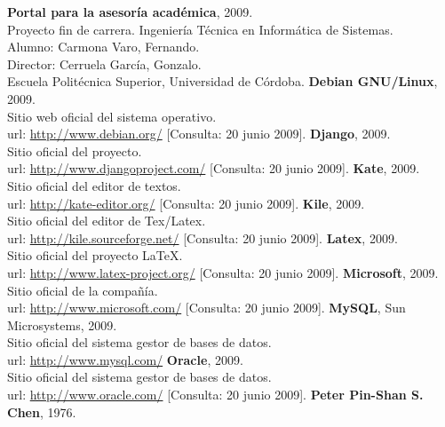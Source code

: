 \begin{thebibliography}{xx}

 \textbf{Portal para la asesoría académica}, 2009.\\
         Proyecto fin de carrera. Ingeniería Técnica en Informática de Sistemas.\\
         Alumno: Carmona Varo, Fernando.\\
         Director: Cerruela García, Gonzalo.\\
         Escuela Politécnica Superior, Universidad de Córdoba.
 \textbf{Debian GNU/Linux}, 2009.\\
         Sitio web oficial del sistema operativo.\\
         url: \url{http://www.debian.org/}
         [Consulta: 20 junio 2009].
 \textbf{Django}, 2009.\\
         Sitio oficial del proyecto.\\
         url: \url{http://www.djangoproject.com/}
         [Consulta: 20 junio 2009].
 \textbf{Kate}, 2009.\\
         Sitio oficial del editor de textos.\\
         url: \url{http://kate-editor.org/}
         [Consulta: 20 junio 2009].
 \textbf{Kile}, 2009.\\
         Sitio oficial del editor de Tex/Latex.\\
         url: \url{http://kile.sourceforge.net/}
         [Consulta: 20 junio 2009].
 \textbf{Latex}, 2009.\\
         Sitio oficial del proyecto \LaTeX.\\
         url: \url{http://www.latex-project.org/}
         [Consulta: 20 junio 2009].
 \textbf{Microsoft}, 2009.\\
         Sitio oficial de la compañía.\\
         url: \url{http://www.microsoft.com/}
         [Consulta: 20 junio 2009].
 \textbf{MySQL}, Sun Microsystems, 2009.\\
         Sitio oficial del sistema gestor de bases de datos.\\
         url: \url{http://www.mysql.com/}
 \textbf{Oracle}, 2009.\\
         Sitio oficial del sistema gestor de bases de datos.\\
         url: \url{http://www.oracle.com/}
         [Consulta: 20 junio 2009].
 \textbf{Peter Pin-Shan S. Chen}, 1976.\\

\end{thebibliography}
